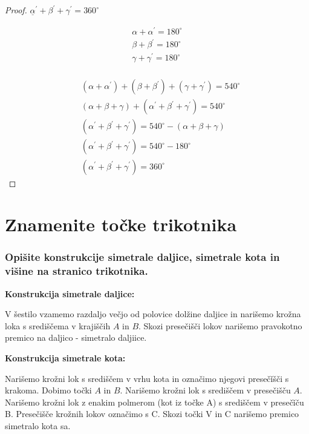 \documentclass{article}
\begin{document}
\begin{proof}
    $\underline{\alpha}^{\prime}+\beta^{\prime}+\gamma^{\prime}=360^{\circ}$

    $$
\begin{aligned}
\alpha+\alpha^{\prime} = 180^{\circ} \\
\beta+\beta^{\prime} = 180^{\circ} \\
\gamma+\gamma^{\prime} = 180^{\circ} \\
\end{aligned}
$$

    $$
\begin{aligned}
& \left(\alpha+\alpha^{\prime}\right)+\left(\beta+\beta^{\prime}\right)+\left(\gamma+\gamma^{\prime}\right)=540^{\circ} \\
& (\alpha+\beta+\gamma)+\left(\alpha^{\prime}+\beta^{\prime}+\gamma^{\prime}\right)=540^{\circ} \\
& \left(\alpha^{\prime}+\beta^{\prime}+\gamma^{\prime}\right)=540^{\circ}-(\alpha+\beta+\gamma) \\
& \left(\alpha^{\prime}+\beta^{\prime}+\gamma^{\prime}\right)=540^{\circ}-180^{\circ} \\
& \left(\alpha^{\prime}+\beta^{\prime}+\gamma^{\prime}\right)=360^{\circ}
\end{aligned}
$$
\end{proof}

\section{Znamenite točke trikotnika}

\subsubsection*{Opišite konstrukcije simetrale daljice, simetrale kota in višine na stranico trikotnika.}

\textbf{Konstrukcija simetrale daljice:}

V šestilo vzamemo razdaljo večjo od polovice dolžine daljice in narišemo krožna loka s središčema v krajiščih $A$ in $B$. Skozi presečišči lokov narišemo pravokotno premico na daljico - simetralo daljiice.

\textbf{Konstrukcija simetrale kota:}

Narišemo krožni lok s središčem v vrhu kota in označimo njegovi presečǐšči s krakoma. Dobimo točki $A$ in $B$. Narišemo krožni lok s središčem v presečišču $A$. Narišemo krožni lok z enakim polmerom (kot iz točke A) s središčem v presečǐču B. Presečišče krožnih lokov označimo s C. Skozi točki V in C narišemo premico simetralo kota sa.
\end{document}
